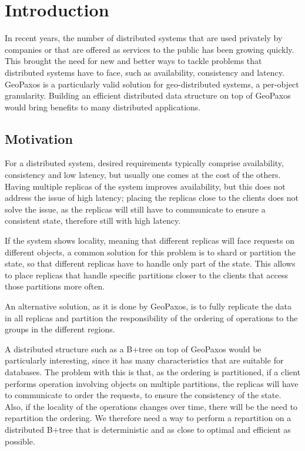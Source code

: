 \chapter{Introduction}\label{sec:introduction}
In recent years, the number of distributed systems that are used privately by companies or that are offered as services to the public has been growing quickly. This brought the need for new and better ways to tackle problems that distributed systems have to face, such as availability, consistency and latency. GeoPaxos is a particularly valid solution for geo-distributed systems, a per-object granularity. Building an efficient distributed data structure on top of GeoPaxos would bring benefits to many distributed applications.

\section{Motivation}\label{sec:motivation}
For a distributed system, desired requirements typically comprise availability, consistency and low latency, but usually one comes at the cost of the others. Having multiple replicas of the system improves availability, but this does not address the issue of high latency; placing the replicas close to the clients does not solve the issue, as the replicas will still have to communicate to ensure a consistent state, therefore still with high latency.

If the system shows locality, meaning that different replicas will face requests on different objects, a common solution for this problem is to shard or partition the state, so that different replicas have to handle only part of the state. This allows to place replicas that handle specific partitions closer to the clients that access those partitions more often.

An alternative solution, as it is done by GeoPaxos, is to fully replicate the data in all replicas and partition the responsibility of the ordering of operations to the groups in the different regions.

A distributed structure such as a B+tree on top of GeoPaxos would be particularly interesting, since it has many characteristics that are suitable for databases. The problem with this is that, as the ordering is partitioned, if a client performs operation involving objects on multiple partitions, the replicas will have to communicate to order the requests, to ensure the consistency of the state. Also, if the locality of the operations changes over time, there will be the need to repartition the ordering. We therefore need a way to perform a repartition on a distributed B+tree that is deterministic and as close to optimal and efficient as possible.

